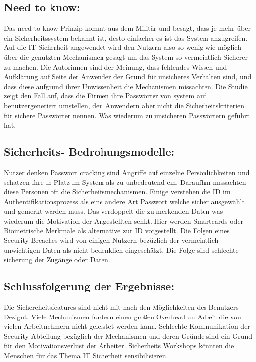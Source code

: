 \subsection{Need to know:}
Das need to know Prinzip kommt aus dem Militär und besagt, dass je mehr über ein Sicherheitssystem bekannt ist, desto einfacher es ist das System anzugreifen. Auf die IT Sicherheit angewendet wird den Nutzern also so wenig wie möglich über die genutzten Mechanismen gesagt um das System so vermeintlich Sicherer zu machen. Die Autorinnen sind der Meinung, dass fehlendes Wissen und Aufklärung auf Seite der Anwender der Grund für unsicheres Verhalten sind, und dass diese aufgrund ihrer Unwissenheit die Mechanismen missachten. Die Studie zeigt den Fall auf, dass die Firmen ihre Passwörter von system auf benutzergeneriert umstellen, den Anwendern aber nicht die Sicherheitskriterien für sichere Passwörter nennen. Was wiederum zu unsicheren Passwörtern geführt hat.

\subsection{Sicherheits- Bedrohungsmodelle:}
Nutzer denken Passwort cracking sind Angriffe auf einzelne Persönlichkeiten und schätzen ihre in Platz im System als zu unbedeutend ein. Daraufhin missachten diese Personen oft die Sicherheitsmechanismen. 
Einige verstehen die ID im Authentifikationsprozess als eine andere Art Passwort welche sicher ausgewählt und gemerkt werden muss. Das verdoppelt die zu merkenden Daten was wiederum die Motivation der Angestellten senkt. Hier werden Smartcards oder Biometrische Merkmale als alternative zur ID vorgestellt.
Die Folgen eines Security Breaches wird von einigen Nutzern bezüglich der vermeintlich unwichtigen Daten als nicht bedenklich eingeschätzt. Die Folge sind schlechte sicherung der Zugänge oder Daten.

\subsection{Schlussfolgerung der Ergebnisse:}
Die Sichereheitsfeatures sind nicht mit nach den Möglichkeiten des Benutzers Designt. Viele Mechanismen fordern einen großen Overhead an Arbeit die von vielen Arbeitnehmern nicht geleistet werden kann.
Schlechte Kommunikation der Security Abteilung bezüglich der Mechanismen und deren Gründe sind ein Grund für den Motivationsverlust der Arbeiter.
Sicherheits Workshops könnten die Menschen für das Thema IT Sicherheit sensibilisieren.

